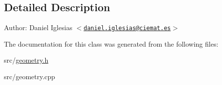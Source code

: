 \subsection{Detailed Description}
\begin{Desc}
\item[Author:]Daniel Iglesias $<$\href{mailto:daniel.iglesias@ciemat.es}{\tt daniel.iglesias@ciemat.es}$>$ \end{Desc}


The documentation for this class was generated from the following files:\begin{CompactItemize}
\item 
src/\hyperlink{geometry_8h}{geometry.h}\item 
src/geometry.cpp\end{CompactItemize}
